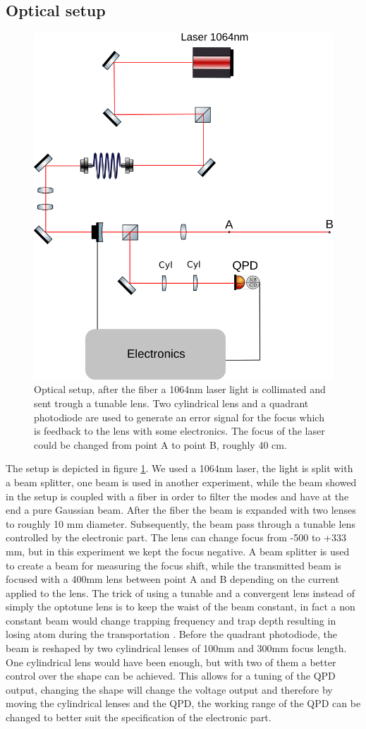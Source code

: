 \documentclass[a4paper,10pt]{article}
\begin{document}
\subsection{Optical setup}
\begin{figure}
\centering
\includegraphics[width = .5\textwidth]{opticsetup}
\caption{Optical setup, after the fiber a 1064nm laser light is collimated and sent trough a tunable lens. Two cylindrical lens and a quadrant photodiode are used to generate an error signal for the focus which is feedback to the lens with some electronics. The focus of the laser could be changed from point A to point B, roughly 40 cm.} \label{img:opticsetup}
\end{figure}
The setup is depicted in figure \ref{img:opticsetup}. We used a 1064nm laser, the light is split with a beam splitter, one beam is used in another experiment, while the beam showed in the setup is coupled with a fiber in order to filter the modes and have at the end a pure Gaussian beam. After the fiber the beam is expanded with two lenses to roughly 10 mm diameter. Subsequently, the beam pass through a tunable lens controlled by the electronic part. The lens can change focus from  -500 to +333 mm, but in this experiment we kept the focus negative. A beam splitter is used to create a beam for measuring the focus shift, while the transmitted beam is focused with a 400mm lens between point A and B depending on the current applied to the lens. The trick of using a tunable and a convergent lens instead of simply the optotune lens is to keep the waist of the beam constant, in fact a non constant beam would change trapping frequency and trap depth resulting in losing atom during the transportation \cite{opticaltransportation}.  Before the quadrant photodiode, the beam is reshaped by two cylindrical lenses of 100mm and 300mm focus length. One cylindrical lens would have been enough, but with two of them a better control over the shape can be achieved. This allows for a tuning of the QPD output, changing the shape will change the voltage output and therefore by moving the cylindrical lenses and the QPD, the working range of the QPD can be changed to better suit the specification of the electronic part.
\end{document}

